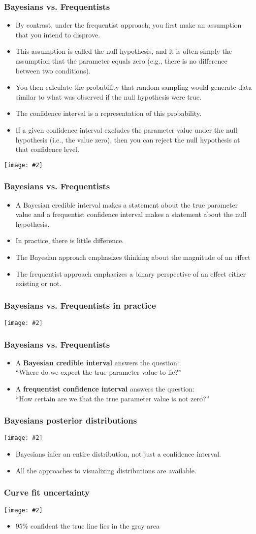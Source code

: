 \documentclass{beamer}
\newcommand{\bi}{\begin{itemize}}
\newcommand{\li}{\item}
\newcommand{\ei}{\end{itemize}}
\newcommand{\fig}[2]{\centerline{\texttt{[image: \#2]}}}
\newcommand{\bfr}[1]{\begin{frame}[fragile]\frametitle{{ #1 }}}
\begin{document}
\bfr{Bayesians vs. Frequentists}
\bi
\li By contrast, under the frequentist approach, you first make an assumption that you intend to disprove. 
\li This assumption is called the null hypothesis, and it is often simply the assumption that the parameter equals zero (e.g., there is no difference between two conditions). 
\li You then calculate the probability that random sampling would generate data similar to what was observed if the null hypothesis were true.
\li The confidence interval is a representation of this probability.
\li If a given confidence interval excludes the parameter value under the null hypothesis (i.e., the value zero), then you can reject the null hypothesis at that confidence level.
\ei
\end{frame}

\begin{frame}
\fig{.8}{ci-frequentist-expl-1.png}
\end{frame}


\bfr{Bayesians vs. Frequentists}
\bi
\li A Bayesian credible interval makes a statement about the true parameter value and a frequentist confidence interval makes a statement about the null hypothesis.
\li In practice, there is little difference.
\li The Bayesian approach  emphasizes thinking about the magnitude of an effect
\li The frequentist approach emphasizes a binary perspective of an effect either existing or not.

\ei
\end{frame}

\bfr{Bayesians vs. Frequentists in practice}
\fig{1}{bayes-vs-ols-1.png}
\end{frame}


\bfr{Bayesians vs. Frequentists}

\bi
\li A {\bf Bayesian credible interval} answers the question:\\ “Where do we expect the true parameter value to lie?” 
\bigskip
\li A {\bf frequentist confidence interval} answers the question:\\ “How certain are we that the true parameter value is not zero?”
\ei
\end{frame}

\bfr{Bayesians posterior distributions}\scriptsize
\fig{1}{bayes-ridgeline-1.png}
\bi
\li Bayesians infer an entire distribution, not just a confidence interval.
\li All the approaches to visualizing distributions are available.
\ei
\end{frame}

\bfr{Curve fit uncertainty}\scriptsize
\fig{.8}{blue-jays-male-conf-band-1.png}
\bi
\li 95\% confident the true line lies in the gray area
\ei
\end{frame}
\end{document}
